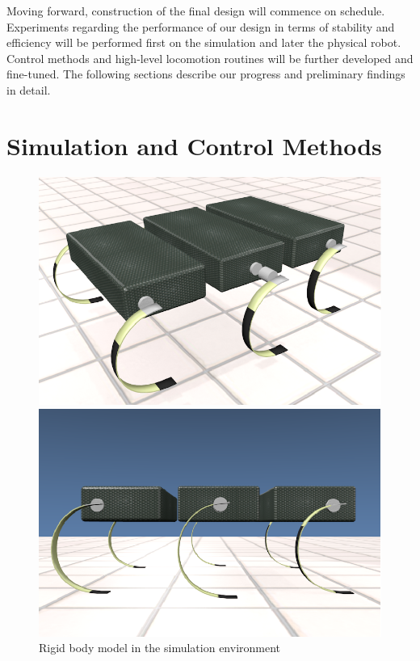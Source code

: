 \documentclass[11pt]{article}
\begin{document}
Moving forward, construction of the final design will commence on schedule. Experiments regarding the performance of our design in terms of stability and efficiency will be performed first on the simulation and later the physical robot. Control methods and high-level locomotion routines will be further developed and fine-tuned. The following sections describe our progress and preliminary findings in detail.

\section{Simulation and Control Methods}

\begin{figure}[ht]
\begin{minipage}[b]{0.45\linewidth}
\centering
\includegraphics[width=\textwidth]{report_gr1.eps}
\end{minipage}
\hspace{0.5cm}
\begin{minipage}[b]{0.45\linewidth}
\centering
\includegraphics[width=\textwidth]{report_gr2.eps}
\end{minipage}
\caption{Rigid body model in the simulation environment}
\end{figure}
\end{document}

